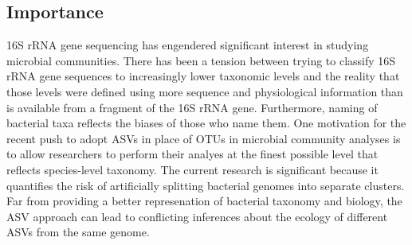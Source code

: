 \documentclass[
]{article}
\begin{document}
\hypertarget{importance}{%
\subsection{Importance}\label{importance}}

16S rRNA gene sequencing has engendered significant interest in studying
microbial communities. There has been a tension between trying to
classify 16S rRNA gene sequences to increasingly lower taxonomic levels
and the reality that those levels were defined using more sequence and
physiological information than is available from a fragment of the 16S
rRNA gene. Furthermore, naming of bacterial taxa reflects the biases of
those who name them. One motivation for the recent push to adopt ASVs in
place of OTUs in microbial community analyses is to allow researchers to
perform their analyes at the finest possible level that reflects
species-level taxonomy. The current research is significant because it
quantifies the risk of artificially splitting bacterial genomes into
separate clusters. Far from providing a better represenation of
bacterial taxonomy and biology, the ASV approach can lead to conflicting
inferences about the ecology of different ASVs from the same genome.

\newpage
\end{document}

